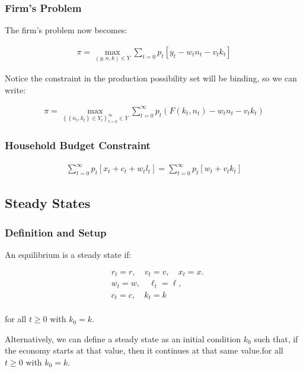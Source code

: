 \documentclass[10pt]{article}
\begin{document}
\subsubsection{Firm's Problem}

The firm's problem now becomes:

\begin{align}
    \pi=\max _{(y, n, k) \in Y} \sum_{t=0} p_t\left[y_t-w_t n_t-v_t k_t\right]
\end{align}


Notice the constraint in the production possibility set will be binding, 
so we can write:

\begin{align}
    \pi=\max _{\left\{\left\{n_t, k_t\right\} \in Y_t\right\}_{t=0}^{\infty} \in Y} \sum_{t=0}^{\infty} p_t\left(F\left(k_t, n_t\right)-w_t n_t-v_t k_t\right)
\end{align}


\subsubsection{Household Budget Constraint}

\begin{align}
    \sum_{t=0}^{\infty} p_t\left[x_t+c_t+w_t l_t\right]=\sum_{t=0}^{\infty} p_t\left[w_t+v_t k_t\right]
\end{align}

\subsection{Steady States}

\subsubsection{Definition and Setup}

An equilibrium is a steady state if:

\begin{align}
        & r_t=r, \quad v_t=v, \quad x_t=x . \\
        & w_t=w, \quad \ell_t=\ell \text {, } \\
        & c_t=c, \quad k_t=k \\
\end{align}

for all $t \geq 0$ with $k_0=k$. 

Alternatively, we can define a steady state as an initial condition $k_0$ such that, if the economy starts at that value, then it continues at that same value.for all $t \geq 0$ with $k_0=k$. 
\end{document}
